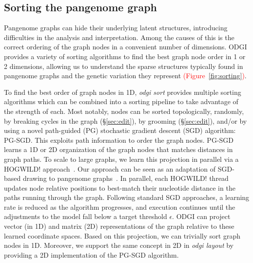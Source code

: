 \documentclass{bioinfo}
\newcommand{\REVIEWED}[1]{{\textcolor{Red}{#1}}}
\begin{document}
\subsection{Sorting the pangenome graph}
\label{sec:sort}

Pangenome graphs can hide their underlying latent structures, introducing difficulties in the analysis and interpretation. %
Among the causes of this is the correct ordering of the graph nodes in a convenient number of dimensions.
ODGI provides a variety of sorting algorithms to find the best graph node order in 1 or 2 dimensions, allowing us
to understand the sparse structures typically found in pangenome graphs and the genetic variation they represent \REVIEWED{(Figure~\ref{fig:sorting})}.

To find the best order of graph nodes in 1D, \textit{odgi sort} provides multiple sorting algorithms which can be combined into a sorting pipeline to take advantage of the strength of each.
Most notably, nodes can be sorted topologically, randomly, by breaking cycles in the graph (\S\ref{sec:edit}), by grooming (\S\ref{sec:edit}), and/or by using a novel path-guided (PG) stochastic gradient descent (SGD) algorithm: PG-SGD.
This exploits path information to order the graph nodes.
PG-SGD learns a 1D or 2D organization of the graph nodes that matches distances in graph paths.
To scale to large graphs, we learn this projection in parallel via a HOGWILD! approach~\citep{niu2011hogwild}.
Our approach can be seen as an adaptation of SGD-based drawing to pangenome graphs~\citep{zheng2018graph}.
In parallel, each HOGWILD! thread updates node relative positions to best-match their nucleotide distance in the paths running through the graph.
Following standard SGD approaches, a learning rate is reduced as the algorithm progresses, and execution continues until the adjustments to the model fall below a target threshold $\epsilon$.
ODGI can project vector (in 1D) and matrix (2D) representations of the graph relative to these learned coordinate spaces.
Based on this projection, we can trivially sort graph nodes in 1D.
Moreover, we support the same concept in 2D in \textit{odgi layout} by providing a 2D implementation of the PG-SGD algorithm.
\end{document}
